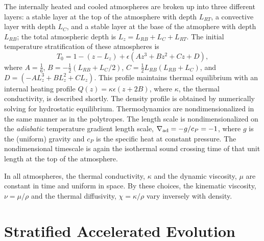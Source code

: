 The internally heated and cooled atmospheres are broken up into three different layers: a stable layer at the top of the atmosphere with depth $L_{RT}$, a convective layer with depth $L_C$, and a stable layer at the base of the atmophere with depth $L_{RB}$; the total atmospheric depth is $L_z = L_{RB} + L_C + L_{RT}$.
The initial temperature stratification of these atmospheres is
\begin{equation}
T_0 = 1 - (z - L_z) + \epsilon(A z^3 + B z^2 + Cz + D),
\end{equation}
where $A = \frac{1}{6}$, $B = -\frac{1}{2}(L_{RB} + L_C/2)$, $C = \frac{1}{2}L_{RB}(L_{RB} + L_C)$, and $D = (-AL_z^3 + BL_z^2 + CL_z)$.
This profile maintains thermal equilibrium with an internal heating profile $Q(z) = \kappa \epsilon(z + 2B)$, where $\kappa$, the thermal conductivity, is described shortly.
The density profile is obtained by numerically solving for hydrostatic equilibrium.
Thermodynamics are nondimensionalized in the same manner as in the polytropes.
The length scale is nondimensionalized on the \emph{adiabatic} temperature gradient length scale, $\nabla_{\text{ad}} = -g/c_P = -1$, where $g$ is the (uniform) gravity and $c_P$ is the specific heat at constant pressure.
The nondimensional timescale is again the isothermal sound crossing time of that unit length at the top of the atmosphere.

In all atmospheres, the thermal conductivity, $\kappa$ and the dynamic viscosity, $\mu$ are constant in time and uniform in space.
By these choices, the kinematic viscosity, $\nu = \mu/\rho$ and the thermal diffusivity, $\chi = \kappa/\rho$ vary inversely with density.


\section{Stratified Accelerated Evolution}

